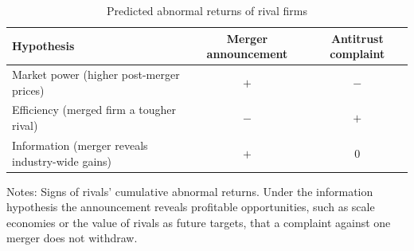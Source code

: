 \begin{table}[htbp]
\centering
\caption{Predicted abnormal returns of rival firms}
\label{tab:11-eventpred}
\footnotesize
\begin{tabular}{@{}lcc@{}}
\toprule
Hypothesis & Merger announcement & Antitrust complaint \\
\midrule
Market power (higher post-merger prices) & $+$ & $-$ \\
Efficiency (merged firm a tougher rival) & $-$ & $+$ \\
Information (merger reveals industry-wide gains) & $+$ & $0$ \\
\bottomrule
\end{tabular}

\smallskip
\begin{minipage}{0.85\linewidth}
\footnotesize Notes: Signs of rivals' cumulative abnormal returns. Under the information hypothesis the
announcement reveals profitable opportunities, such as scale economies or the value of rivals as future targets,
that a complaint against one merger does not withdraw.
\end{minipage}
\end{table}

